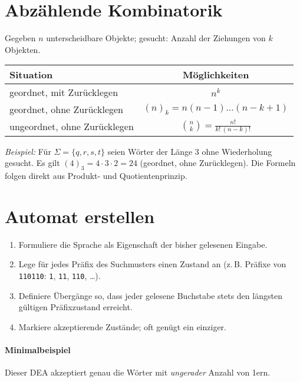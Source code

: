 \section{Abzählende Kombinatorik}\label{sec:comb}
Gegeben $n$ unterscheidbare Objekte; gesucht: Anzahl der Ziehungen von $k$ Objekten.

\renewcommand{\arraystretch}{1.2}
\begin{center}
\begin{tabular}{@{}l|c@{}}
\textbf{Situation} & \textbf{Möglichkeiten}\\\hline
geordnet, mit Zurücklegen       & $n^{k}$ \\
geordnet, ohne Zurücklegen      & $(n)_k = n(n-1)\dots(n-k+1)$ \\
ungeordnet, ohne Zurücklegen    & $\displaystyle \binom{n}{k} = \frac{n!}{k!\,(n-k)!}$
\end{tabular}
\end{center}

\noindent\textit{Beispiel:} Für $\Sigma=\{q,r,s,t\}$ seien Wörter der Länge 3 ohne Wiederholung gesucht.  
Es gilt $(4)_3 = 4\cdot3\cdot2=24$ (geordnet, ohne Zurücklegen).  
Die Formeln folgen direkt aus Produkt- und Quotientenprinzip.

\section{Automat erstellen}
\begin{enumerate}
  \item Formuliere die Sprache als Eigenschaft der bisher gelesenen Eingabe.
  \item Lege für jedes Präfix des Suchmusters einen Zustand an (z.\,B. Präfixe von \texttt{110110}: \texttt{1}, \texttt{11}, \texttt{110}, …).
  \item Definiere Übergänge so, dass jeder gelesene Buchstabe stets den längsten gültigen Präfixzustand erreicht.
  \item Markiere akzeptierende Zustände; oft genügt ein einziger.
\end{enumerate}

\paragraph{Minimalbeispiel}\leavevmode
\begin{center}
\end{center}
Dieser DEA akzeptiert genau die Wörter mit \emph{ungerader} Anzahl von 1ern.

